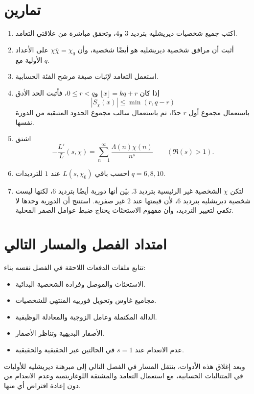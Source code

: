 \section{تمارين}

\begin{enumerate}
  \item اكتب جميع شخصيات ديريشليه بترديد \(3\) و\(4\)، وتحقق مباشرة من
  علاقتي التعامد.
  \item أثبت أن مرافق شخصية ديريشليه هو أيضًا شخصية، وأن
  \(\chi\overline\chi=\chi_0\) على الأعداد الأولية مع \(q\).
  \item استعمل التعامد لإثبات صيغة مرشح الفئة الحسابية.
  \item إذا كان \(\lfloor x\rfloor=kq+r\) و\(0\leq r<q\)، فأثبت الحد
  الأدق
  \[
  |S_\chi(x)|\leq \min(r,q-r)
  \]
  باستعمال مجموع أول \(r\) حدًا، ثم باستعمال سالب مجموع الحدود المتبقية
  من الدورة نفسها.
  \item اشتق
  \[
  -\frac{L'}{L}(s,\chi)
  =
  \sum_{n=1}^{\infty}\frac{\Lambda(n)\chi(n)}{n^s}
  \qquad(\Re(s)>1).
  \]
  \item احسب باقي \(L(s,\chi_0)\) عند \(1\) للترديدات
  \(q=6,8,10\).
  \item لتكن \(\chi\) الشخصية غير الرئيسية بترديد \(3\). بيّن أنها
  دورية أيضًا بترديد \(6\)، لكنها ليست شخصية ديريشليه بترديد \(6\)، لأن
  قيمتها عند \(2\) غير صفرية. استنتج أن الدورية وحدها لا تكفي لتغيير
  الترديد، وأن مفهوم الاستحثاث يحتاج ضبط عوامل الصفر المحلية.
\end{enumerate}

\section{امتداد الفصل والمسار التالي}

تتابع ملفات الدفعات اللاحقة في الفصل نفسه بناء:

\begin{itemize}
  \item الاستحثاث والموصل وفرادة الشخصية البدائية.
  \item مجاميع غاوس وتحويل فورييه المنتهي للشخصيات.
  \item الدالة المكتملة وعامل الزوجية والمعادلة الوظيفية.
  \item الأصفار البديهية وتناظر الأصفار.
  \item عدم الانعدام عند \(s=1\) في الحالتين غير الحقيقية والحقيقية.
\end{itemize}

وبعد إغلاق هذه الأدوات، ينتقل المسار في الفصل التالي إلى مبرهنة ديريشليه
للأوليات في المتتاليات الحسابية، مع استعمال التعامد والمشتقة اللوغاريتمية
وعدم الانعدام من دون إعادة افتراض أي منها.
